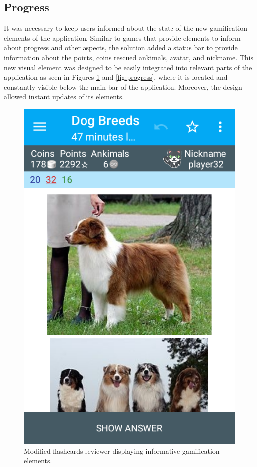 \subsection{Progress}
It was necessary to keep users informed about the state of the new gamification elements of the application. Similar to games that provide elements to inform about progress and other aspects, the solution added a status bar to provide information about the points, coins rescued ankimals, avatar, and nickname. This new visual element was designed to be easily integrated into relevant parts of the application as seen in Figures \ref{fig:reviewer-modified} and \ref{fig:progress}, where it is located and constantly visible below the main bar of the application. Moreover, the design allowed instant updates of its elements.

\begin{figure}[htb]
    \vskip 5mm
        \begin{center}
            \includegraphics[scale=0.4]{./Figures/modified_reviewer.png}
            \caption{Modified flashcards reviewer displaying informative gamification elements.}
            \label{fig:reviewer-modified}
        \end{center}
    \vskip -5mm
\end{figure}

